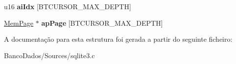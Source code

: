\begin{DoxyCompactItemize}
\item 
\hypertarget{struct_bt_cursor_a037a739198de5bee22ca203d34e90af1}{u16 {\bfseries ai\-Idx} \mbox{[}B\-T\-C\-U\-R\-S\-O\-R\-\_\-\-M\-A\-X\-\_\-\-D\-E\-P\-T\-H\mbox{]}}\label{struct_bt_cursor_a037a739198de5bee22ca203d34e90af1}

\item 
\hypertarget{struct_bt_cursor_ad3414d944f9578e86e26c6158f92096b}{\hyperlink{struct_mem_page}{Mem\-Page} $\ast$ {\bfseries ap\-Page} \mbox{[}B\-T\-C\-U\-R\-S\-O\-R\-\_\-\-M\-A\-X\-\_\-\-D\-E\-P\-T\-H\mbox{]}}\label{struct_bt_cursor_ad3414d944f9578e86e26c6158f92096b}

\end{DoxyCompactItemize}


A documentação para esta estrutura foi gerada a partir do seguinte ficheiro\-:\begin{DoxyCompactItemize}
\item 
Banco\-Dados/\-Sources/sqlite3.\-c\end{DoxyCompactItemize}
